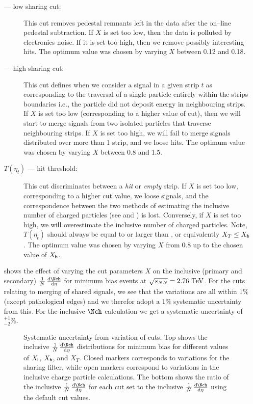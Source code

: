 \begin{description}
\item[ --- low sharing cut:]  This cut removes pedestal
  remnants left in the data after the on--line pedestal subtraction.
  If $X$ is set too low, then the data is polluted by electronics
  noise.  If it is set too high, then we remove possibly interesting
  hits.  The optimum value was chosen by varying $X$ between 0.12 and
  0.18. 
\item[ --- high sharing cut:]  This cut defines when we
  consider a signal in a given strip $t$ as corresponding to the
  traversal of a single particle entirely within the strips boundaries
  i.e., the particle did not deposit energy in neighbouring strips.
  If $X$ is set too low (corresponding to a higher value of cut), then
  we will start to merge signals from two isolated particles that
  traverse neighbouring strips.  If $X$ is set too high, we will fail
  to merge signals distributed over more than 1 strip, and we loose
  hits.  The optimum value was chosen by varying $X$ between 0.8 and
  1.5. 
\item[$T(\eta_t)$ --- hit threshold:] This cut discriminates between a
  \emph{hit} or \emph{empty} strip.  If $X$ is set too low,
  corresponding to a higher cut value, we loose signals, and the
  correspondence between the two methods of estimating the inclusive
  number of charged particles (see  and
  ) is lost.  Conversely, if $X$ is set
  too high, we will overestimate the inclusive number of charged
  particles. Note, $T(\eta_t)$ should always be equal to or larger
  than , or equivalently $X_T\le X_{\DataSty{h}}$.  The
  optimum value was chosen by varying $X$ from 0.8 up to the chosen
  value of $X_{\DataSty{h}}$.
\end{description}

 shows the effect of varying the cut
parameters $X$ on the inclusive (primary and secondary) $\ndndeta$ for
minimum bias \PbPbCol{} events at $\usNN{PbPb}{2760}$.  For the cuts
relating to merging of shared signals, we see that the variations are
all within $1\%$ (except pathological edges) and we therefor adopt a
$1\%$ systematic uncertainty from this.  For the inclusive $\Nch$
calculation we get a systematic uncertainty of ${}_{-2}^{+1}\%$.

\begin{figure}[h!tbp]
  \centering
  \caption{Systematic uncertainty from variation of cuts.  Top shows
    the inclusive $\ndndeta$ distributions for minimum bias \PbPbCol{}
    for different values of $X_{\DataSty{l}}$, $X_{\DataSty{h}}$, and
    $X_T$.  Closed markers corresponds to variations for the sharing
    filter, while open markers correspond to variations in the
    inclusive charge particle calculations.  The bottom shows the
    ratio of the inclusive $\ndndeta$ for each cut set to the
    inclusive $\ndndeta$ using the default cut values. }
  \label{fig:cuts:syserr}
\end{figure}



